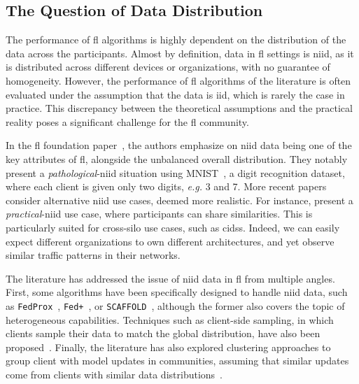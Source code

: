 \subsection{The Question of Data Distribution\label{sec:bg.fl.data}}


The performance of \gls{fl} algorithms is highly dependent on the distribution of the data across the participants.
Almost by definition, data in \gls{fl} settings is \gls{niid}, as it is distributed across different devices or organizations, with no guarantee of homogeneity.
However, the performance of \gls{fl} algorithms of the literature is often evaluated under the assumption that the data is \gls{iid}, which is rarely the case in practice.
This discrepancy between the theoretical assumptions and the practical reality poses a significant challenge for the \gls{fl} community.

In the \gls{fl} foundation paper~\cite{mcmahan_Communicationefficientlearningdeep_2017}, the authors emphasize on \gls{niid} data being one of the key attributes of \gls{fl}, alongside the unbalanced overall distribution.
They notably present a \emph{pathological}-\gls{niid} situation using MNIST~\cite{lecun_Gradientbasedlearningapplied_1998}, a digit recognition dataset, where each client is given only two digits, \emph{e.g.} 3 and 7.
More recent papers consider alternative \gls{niid} use cases, deemed more realistic.
For instance, \textcite{huang_PersonalizedCrossSiloFederated_2021} present a \emph{practical}-\gls{niid} use case, where participants can share similarities.
This is particularly suited for cross-silo use cases, such as \glspl{cids}.
Indeed, we can easily expect different organizations to own different architectures, and yet observe similar traffic patterns in their networks.

The literature has addressed the issue of \gls{niid} data in \gls{fl} from multiple angles.
First, some algorithms have been specifically designed to handle \gls{niid} data, such as \texttt{FedProx}~\cite{li_FederatedOptimizationHeterogeneous_2020}, \texttt{Fed+}~\cite{kundu_RobustnessPersonalizationFederated_2022a}, or \texttt{SCAFFOLD}~\cite{karimireddy_SCAFFOLDStochasticControlled_2020}, although the former also covers the topic of heterogeneous capabilities.
Techniques such as client-side sampling, in which clients sample their data to match the global distribution, have also been proposed~\cite{han_HeterogeneousDataAwareFederated_2024}.
Finally, the literature has also explored clustering approaches to group client with model updates in communities, assuming that similar updates come from clients with similar data distributions~\cite{ye_PFedSAPersonalizedFederated_2023}.


